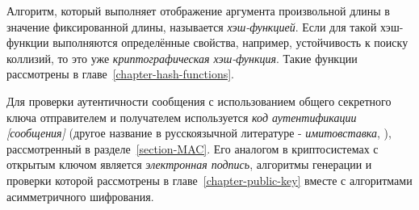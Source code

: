 Алгоритм, который выполняет отображение аргумента произвольной длины в значение фиксированной длины, называется \emph{хэш-функцией}. Если для такой хэш-функции выполняются определённые свойства, например, устойчивость к поиску коллизий, то это уже \emph{криптографическая хэш-функция}. Такие функции рассмотрены в главе~\ref{chapter-hash-functions}.

Для проверки аутентичности сообщения с использованием общего секретного ключа отправителем и получателем используется \emph{код аутентификации [сообщения]} (другое название в русскоязычной литературе - \emph{имитовставка}, ), рассмотренный в разделе~\ref{section-MAC}. Его аналогом в криптосистемах с открытым ключом является \emph{электронная подпись}, алгоритмы генерации и проверки которой рассмотрены в главе~\ref{chapter-public-key} вместе с алгоритмами асимметричного шифрования.
